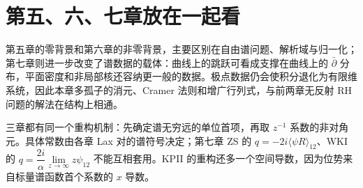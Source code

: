 \documentclass[lang=cn,scheme=chinese,mode=simple,device=normal,color=blue,math=cm,thmcnt=section,12pt]{elegantbook}
\begin{document}
\section*{第五、六、七章放在一起看}
第五章的零背景和第六章的非零背景，主要区别在自由谱问题、解析域与归一化；第七章则进一步改变了谱数据的载体：曲线上的跳跃可看成支撑在曲线上的 $\bar\partial$ 分布，平面密度和非局部核还容纳更一般的数据。极点数据仍会使积分退化为有限维系统，因此本章多孤子的消元、Cramer 法则和增广行列式，与前两章无反射 RH 问题的解法在结构上相通。

三章都有同一个重构机制：先确定谱无穷远的单位首项，再取 $z^{-1}$ 系数的非对角元。具体常数由各章 Lax 对的谱符号决定；第七章 ZS 的 $q=-2i\langle\psi R\rangle_{12}$、WKI 的 $q=\dfrac{2i}{\alpha}\displaystyle\lim\limits_{z\to\infty}z\psi_{12}$ 不能互相套用。KPII 的重构还多一个空间导数，因为位势来自标量谱函数首个系数的 $x$ 导数。
\end{document}
